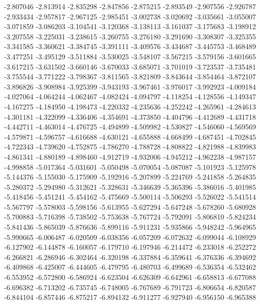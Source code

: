 -2.807046
-2.813914
-2.835298
-2.847856
-2.875215
-2.893549
-2.907556
-2.926787
-2.933434
-2.957817
-2.967125
-2.985451
-3.002738
-3.020692
-3.035661
-3.055007
-3.071859
-3.086203
-3.104541
-3.120368
-3.138113
-3.161037
-3.175683
-3.198912
-3.207558
-3.225031
-3.238615
-3.260755
-3.276180
-3.291690
-3.308307
-3.325355
-3.341585
-3.360621
-3.384745
-3.391111
-3.409576
-3.434687
-3.445753
-3.468489
-3.477251
-3.495129
-3.511884
-3.530025
-3.548107
-3.567215
-3.579156
-3.601665
-3.617215
-3.631502
-3.660146
-3.670033
-3.685071
-3.701019
-3.723537
-3.735481
-3.755544
-3.771222
-3.798367
-3.811565
-3.821809
-3.843644
-3.854464
-3.872107
-3.896826
-3.908984
-3.925399
-3.943193
-3.967461
-3.976017
-3.992923
-4.009184
-4.027064
-4.064244
-4.062467
-4.082424
-4.094797
-4.118254
-4.128556
-4.149347
-4.167275
-4.184950
-4.198473
-4.220332
-4.235636
-4.252242
-4.265961
-4.284613
-4.301181
-4.322099
-4.336406
-4.354691
-4.373850
-4.404796
-4.412689
-4.431718
-4.442711
-4.463014
-4.476725
-4.494899
-4.509982
-4.530827
-4.546060
-4.569569
-4.579871
-4.596757
-4.616688
-4.630121
-4.655888
-4.668499
-4.687451
-4.702845
-4.722343
-4.739620
-4.752875
-4.786270
-4.788728
-4.808822
-4.821988
-4.839983
-4.861341
-4.880189
-4.898460
-4.912719
-4.932006
-4.945212
-4.962238
-4.987157
-4.998858
-5.017364
-5.031601
-5.050498
-5.070054
-5.087087
-5.101923
-5.125978
-5.144376
-5.155030
-5.175909
-5.192916
-5.207899
-5.224769
-5.241858
-5.264835
-5.280372
-5.294980
-5.312621
-5.328631
-5.346639
-5.365396
-5.386016
-5.401985
-5.418456
-5.451241
-5.454162
-5.475669
-5.500114
-5.506293
-5.526022
-5.541514
-5.567797
-5.578003
-5.598156
-5.613955
-5.627294
-5.647248
-5.678260
-5.680928
-5.700883
-5.716398
-5.738502
-5.753638
-5.767724
-5.792091
-5.806810
-5.824234
-5.841436
-5.865039
-5.876636
-5.899116
-5.911231
-5.935866
-5.948242
-5.964965
-5.990665
-6.006487
-6.020509
-6.038356
-6.057209
-6.072632
-6.099044
-6.108929
-6.127902
-6.144878
-6.160057
-6.179710
-6.197946
-6.214472
-6.233018
-6.252272
-6.266821
-6.286946
-6.302464
-6.320198
-6.337884
-6.359641
-6.376336
-6.394692
-6.409868
-6.425007
-6.444605
-6.479795
-6.480703
-6.499689
-6.536354
-6.532462
-6.553952
-6.572800
-6.586924
-6.623504
-6.626309
-6.642961
-6.658813
-6.677088
-6.696382
-6.713202
-6.735745
-6.748005
-6.767689
-6.791723
-6.806654
-6.820587
-6.844104
-6.857446
-6.875217
-6.894132
-6.911277
-6.927940
-6.956150
-6.965388
